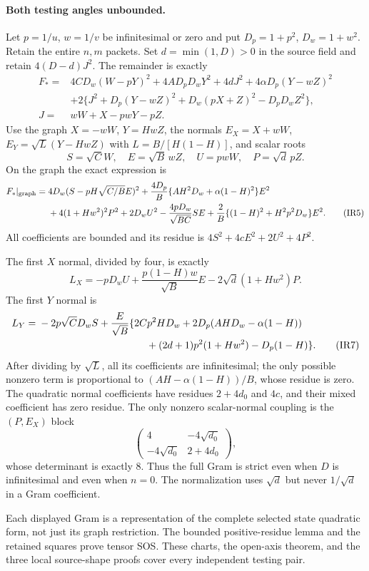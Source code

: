 \paragraph{Both testing angles unbounded.}
Let $p=1/u$, $w=1/v$ be infinitesimal or zero and put
$D_p=1+p^2$, $D_w=1+w^2$.
Retain the entire $n,m$ packets. Set $d=\min(1,D)>0$ in the source
field and retain $4(D-d)J^2$. The remainder is exactly
\begin{align*}
 F_*={}&4CD_w(W-pY)^2+4AD_pD_wY^2+4dJ^2
       +4\alpha D_p(Y-wZ)^2\\
 &+2\{J^2+D_p(Y-wZ)^2+D_w(pX+Z)^2-D_pD_wZ^2\},\\
 J={}&wW+X-pwY-pZ.
\end{align*}
Use the graph $X=-wW$, $Y=HwZ$, the normals
$E_X=X+wW$, $E_Y=\sqrt L(Y-HwZ)$ with
$L=B/[H(1-H)]$, and scalar roots
\[
 S=\sqrt C W,\quad E=\sqrt B\,wZ,\quad
 U=pwW,\quad P=\sqrt d\,pZ.
\tag{IR4}
\]
On the graph the exact expression is
\begin{align*}
 F_*|_{\rm graph}={}&4D_w(S-pH\sqrt{C/B}E)^2
 +\frac{4D_p}{B}\{AH^2D_w+\alpha(1-H)^2\}E^2\\
 &+4(1+Hw^2)^2P^2+2D_wU^2
 -\frac{4pD_w}{\sqrt{BC}}SE
 +\frac2B\{(1-H)^2+H^2p^2D_w\}E^2.
\tag{IR5}
\end{align*}
All coefficients are bounded and its residue is
$4S^2+4cE^2+2U^2+4P^2$.

The first $X$ normal, divided by four, is exactly
\[
 L_X=-pD_wU+\frac{p(1-H)w}{\sqrt B}E
               -2\sqrt d(1+Hw^2)P.
\tag{IR6}
\]
The first $Y$ normal is
\begin{align*}
 L_Y={}&-2p\sqrt C D_w S+\frac{E}{\sqrt B}
 \{2Cp^2HD_w+2D_p(AHD_w-\alpha(1-H))\\
 &\hspace{38mm}+(2d+1)p^2(1+Hw^2)-D_p(1-H)\}.
\tag{IR7}
\end{align*}
After dividing by $\sqrt L$, all its coefficients are infinitesimal;
the only possible nonzero term is proportional to
$(AH-\alpha(1-H))/B$, whose residue is zero.
The quadratic normal coefficients have residues
$2+4d_0$ and $4c$, and their mixed coefficient has zero residue.
The only nonzero scalar-normal coupling is the $(P,E_X)$ block
\[
 \begin{pmatrix}4&-4\sqrt{d_0}\\-4\sqrt{d_0}&2+4d_0\end{pmatrix},
\tag{IR8}
\]
whose determinant is exactly $8$. Thus the full Gram is strict even
when $D$ is infinitesimal and even when $n=0$. The normalization uses
$\sqrt d$ but never $1/\sqrt d$ in a Gram coefficient.

Each displayed Gram is a representation of the complete selected
state quadratic form, not just its graph restriction. The bounded
positive-residue lemma and the retained squares prove tensor SOS.
These charts, the open-axis theorem, and the three local source-shape
proofs cover every independent testing pair.
